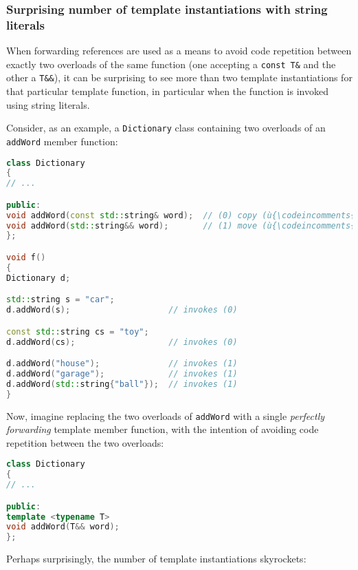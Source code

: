 \subsubsection[Surprising number of template instantiations with string literals]{Surprising number of template instantiations with string literals}\label{surprising-number-of-template-instantiations-with-string-literals}

When forwarding references are used as a means to avoid code repetition
between exactly two overloads of the same function (one accepting a
\texttt{const}~\texttt{T\&} and the other a \texttt{T\&\&}), it can be
surprising to see more than two template instantiations for that
particular template function, in particular when the function is invoked
using string literals.

Consider, as an example, a \texttt{Dictionary} class containing two
overloads of an \texttt{addWord} member function:

\begin{lstlisting}[language=C++]
class Dictionary
{
// ...

public:
void addWord(const std::string& word);  // (0) copy (ù{\codeincomments{word}}ù) in the dictionary
void addWord(std::string&& word);       // (1) move (ù{\codeincomments{word}}ù) in the dictionary
};

void f()
{
Dictionary d;

std::string s = "car";
d.addWord(s);                    // invokes (0)

const std::string cs = "toy";
d.addWord(cs);                   // invokes (0)

d.addWord("house");              // invokes (1)
d.addWord("garage");             // invokes (1)
d.addWord(std::string{"ball"});  // invokes (1)
}
\end{lstlisting}

\noindent Now, imagine replacing the two overloads of \texttt{addWord} with a
single \textit{perfectly forwarding} template member function, with the intention
of avoiding code repetition between the two overloads:

\begin{lstlisting}[language=C++]
class Dictionary
{
// ...

public:
template <typename T>
void addWord(T&& word);
};
\end{lstlisting}

\noindent Perhaps surprisingly, the number of template instantiations skyrockets:


